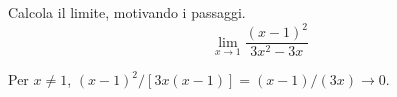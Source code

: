 
\begin{esercizio}
Calcola il limite, motivando i passaggi.
\[
        \lim_{x\to 1}\frac{(x-1)^2}{3x^2-3x}
    \]
\end{esercizio}

\begin{soluzione}
Per $x\ne1$, $(x-1)^2/[3x(x-1)]=(x-1)/(3x)\to0$.
\end{soluzione}
